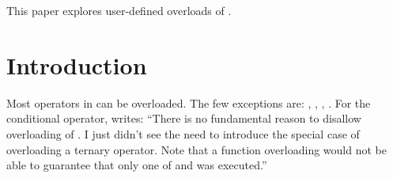 \newcommand\wgTitle{Making operator?: overloadable}
\newcommand\wgName{Matthias Kretz <m.kretz@gsi.de>}
\newcommand\wgDocumentNumber{P0917R1}
\newcommand\wgGroup{EWG}

\usepackage{mymacros}
\usepackage{wg21}
\usepackage{underscore}



\newcommand\simd[1][]{\type{simd#1}\xspace}
\newcommand\simdT{\type{simd<T>}\xspace}
\newcommand\valuetype{\type{value\_type}\xspace}
\newcommand\referencetype{\type{reference}\xspace}
\newcommand\whereexpression{\type{where\_expression}\xspace}
\newcommand\simdcast{\code{simd\_cast}\xspace}
\newcommand\mask[1][]{\type{simd\_mask#1}\xspace}
\newcommand\maskT{\type{simd\_mask<T>}\xspace}
\newcommand\fixedsizeN{\type{simd\_abi::fixed\_size<N>}\xspace}
\newcommand\fixedsizescoped{\type{simd\_abi::fixed\_size}\xspace}
\newcommand\fixedsize{\type{fixed\_size}\xspace}
\newcommand\simdEP{\code{execution::}\type{simd}\xspace}
\newcommand\seqEP{\code{execution::}\type{seq}\xspace}

\usepackage{pifont}

\newcommand\foralli[1][]{for all \code i $\in$ \code{[0, #1size())}\xspace}
\newcommand\forallmaskedi[1]{%
  for all \code i
  $\in \{j \in \mathbb{N}_0 | j < \code{size()} ⋀ \code{#1[}j\code{]}\}$%
  \xspace%
}
\newcommand\chck{\item[\color{black}\ensuremath{\checkmark}]}
\newcommand\todo{\item[\color{black}\ding{46}] \color{gray}}
\newcommand\itemheader[1]{\item[] \hfill \textcolor{gray}{\textsc{#1}}}


\begin{wgTitlepage}
  This paper explores user-defined overloads of .
\end{wgTitlepage}

\pagestyle{scrheadings}
\section{Introduction}
Most operators in \CC{} can be overloaded.
The few exceptions are: , \code{::}, , .
For the conditional operator, \textcite{StrFaq} writes:
“There is no fundamental reason to disallow overloading of .
I just didn't see the need to introduce the special case of overloading a ternary operator.
Note that a function overloading  would not be able to guarantee that only one of  and  was executed.”

